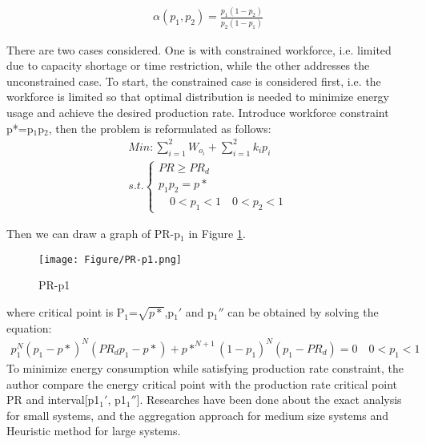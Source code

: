 \begin{equation} \label{eq:3.5}
\begin{split}
\alpha(p_{1},p_{2})=\frac{p_{1}(1-p_{2})}{p_{2}(1-p_{1})}
\end{split}
\end{equation}

There are two cases considered. One is with constrained workforce, i.e. limited due to capacity shortage or time restriction, while the other addresses the unconstrained case. To start, the constrained case is considered first, i.e. the workforce is limited so that optimal distribution is needed to minimize energy usage and achieve the desired production rate. Introduce workforce constraint p*=p$_1$p$_2$, then the problem is reformulated as follows:
\begin{equation} \label{eq:3.6}
\begin{split}
Min:\sum_{i=1}^{2}W_{o_{i}}+\sum_{i=1}^{2}k_{i}p_{i}
\\
s.t.\left\{\begin{matrix}
PR\geq PR_{d}\\ 
p_{1}p_{2}=p*\\ 
\quad 0<p_{1}<1 \quad 0<p_{2}<1
\end{matrix}\right.
\end{split}
\end{equation}

 Then we can draw a graph of PR-p$_{1}$ in Figure \ref{fig:PR-p1}.
 \begin{figure}[h!]
	\centering
	\texttt{[image: Figure/PR-p1.png]}
	\caption{PR-p1}
	\label{fig:PR-p1}
\end{figure}
 
 where critical point is P$_1$=$\sqrt{p*}$,p$_{1}'$ and p$_{1}''$ can be obtained by solving the equation:
\begin{equation} \label{eq:3.7}
\begin{split}
p_{1}^{N}(p_{1}-p*)^{N}(PR_{d}p_{1}-p*)+p*^{N+1}(1-p_{1})^{N}(p_{1}-PR_{d})=0 \quad 0<p_{1}<1
\end{split}
\end{equation}
 To minimize energy consumption while satisfying production rate constraint, the author compare the energy critical point with the production rate critical point PR and interval[p1$_{1}'$, p1$_{1}''$].
Researches have been done about the exact analysis for small systems, and the aggregation approach for medium size systems and Heuristic method for large systems\cite{Su2017}.
 
